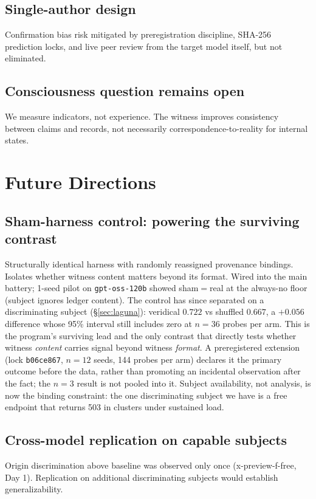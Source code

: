 \documentclass[11pt]{article}
\begin{document}
\subsection{Single-author design}
Confirmation bias risk mitigated by preregistration discipline, SHA-256
prediction locks, and live peer review from the target model itself, but
not eliminated.

\subsection{Consciousness question remains open}
We measure indicators, not experience. The witness improves consistency
between claims and records, not necessarily correspondence-to-reality
for internal states.

\section{Future Directions}\label{sec:future}

\subsection{Sham-harness control: powering the surviving contrast}
Structurally identical harness with randomly reassigned provenance
bindings. Isolates whether witness content matters beyond its format.
Wired into the main battery; 1-seed pilot on \texttt{gpt-\allowbreak{}oss-\allowbreak{}120b}
showed sham$=$real at the always-no floor (subject ignores ledger
content). The control has since separated on a discriminating subject
(\S\ref{sec:laguna}): veridical $0.722$ vs shuffled $0.667$, a $+0.056$
difference whose 95\% interval still includes zero at $n=36$ probes per
arm. This is the program's surviving lead and the only contrast that
directly tests whether witness \emph{content} carries signal beyond
witness \emph{format}. A preregistered extension (lock
\texttt{b06ce867}, $n=12$ seeds, 144 probes per arm) declares it the
primary outcome before the data, rather than promoting an incidental
observation after the fact; the $n=3$ result is not pooled into it.
Subject availability, not analysis, is now the binding constraint: the
one discriminating subject we have is a free endpoint that returns 503
in clusters under sustained load.

\subsection{Cross-model replication on capable subjects}
Origin discrimination above baseline was observed only once
(x-preview-f-free, Day 1). Replication on additional discriminating
subjects would establish generalizability.
\end{document}
